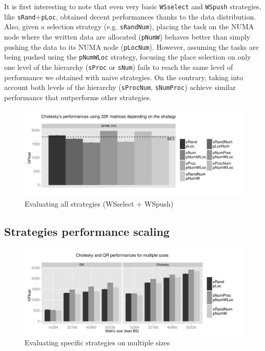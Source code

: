\documentclass{Styles/llncs}
\begin{document}
It is first interesting to note that even very basic \verb/WSselect/
and \verb/WSpush/ strategies, like \verb/sRand/+\verb/pLoc/, obtained decent performances
thanks to the data distribution.
Also, given a selection strategy (e.g. \verb/sRandNum/), placing
the task on the NUMA node where the written data are allocated (\verb/pNumW/) behaves better than simply pushing the data to its NUMA node (\verb/pLocNum/).
However, assuming the tasks are being pushed using the \verb/pNumWLoc/ strategy, focusing the
place selection on only one level of the hierarchy (\verb/sProc/ or \verb/sNum/)
fails to reach the same level of performance we obtained with naive strategies.
On the contrary, taking into account both levels of the hierarchy (\verb/sProcNum/,
\verb/sNumProc/) achieve similar performance that outperforms other strategies.

\begin{figure}[t]
  \centering
  \includegraphics[scale=0.5]{figures/graph_all_strat.pdf}
  \caption{Evaluating all strategies (WSselect + WSpush)}
\label{fig:eval-all-strat}
\end{figure}


\subsection{Strategies performance scaling}

\begin{figure}[t]
  \centering
  \includegraphics[scale=0.5]{figures/graph_details_strat.pdf}
\caption{Evaluating specific strategies on multiple sizes}
\label{fig:eval-strat-sizes}
\end{figure}
\end{document}
